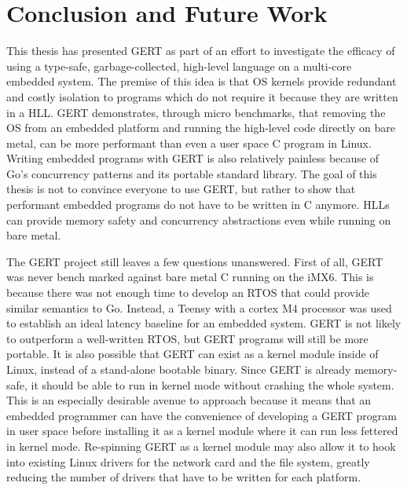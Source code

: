 \chapter{Conclusion and Future Work}

This thesis has presented GERT as part of an effort to investigate the efficacy of using
a type-safe, garbage-collected, high-level language on a multi-core embedded system. The premise
of this idea is that OS kernels provide redundant and costly isolation to programs which
do not require it because they are written in a HLL. GERT demonstrates, through micro benchmarks,
that removing the OS
from an embedded platform and running the high-level code directly on bare metal, can be
more performant than even a user space C program in Linux. Writing embedded programs with GERT
is also relatively painless because of Go's concurrency patterns and its portable standard library.
The goal of this thesis is not to convince everyone to use GERT, but rather to show that performant
embedded programs do not have to be written in C anymore. HLLs can provide memory safety and concurrency abstractions
even while running on bare metal.

The GERT project still leaves a few questions unanswered. First of all, GERT was
never bench marked against bare metal C running on the iMX6. This is because there was not enough time to develop an
RTOS that could provide similar semantics to Go. Instead, a Teensy with a cortex M4 processor was used
to establish an ideal latency baseline for an embedded system. GERT is not likely to outperform a well-written
RTOS, but GERT programs will still be more portable. It is also possible that GERT can exist as
a kernel module inside of Linux, instead of a stand-alone bootable binary. Since GERT is already
memory-safe, it should be able to run in kernel mode without crashing the whole system. This is
an especially desirable avenue to approach because it means that an embedded programmer can have
the convenience of developing a GERT program in user space before installing it as a kernel
module where it can run less fettered in kernel mode. Re-spinning GERT as a kernel module may also
allow it to hook into existing Linux drivers for the network card and the file system, greatly reducing
the number of drivers that have to be written for each platform.
